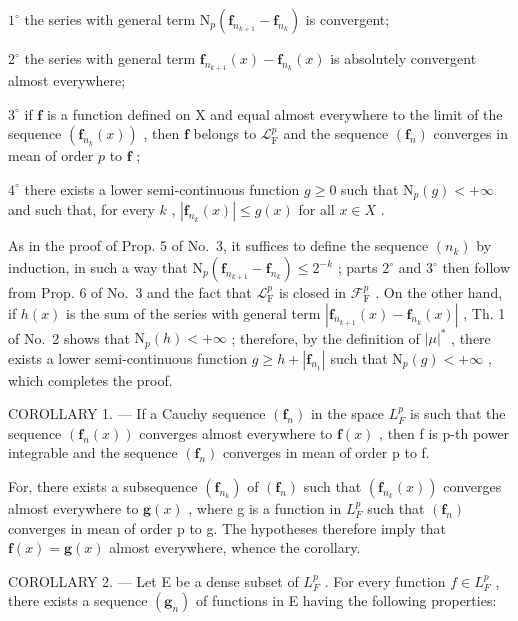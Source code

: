 \(1^{\circ}\) the series with general term \(\mathrm{N}_p(\mathbf{f}_{n_{k + 1}} - \mathbf{f}_{n_k})\) is convergent;

\(2^{\circ}\) the series with general term \(\mathbf{f}_{n_{k+1}}(x) - \mathbf{f}_{n_k}(x)\) is absolutely convergent almost everywhere;

\(3^{\circ}\) if \(\mathbf{f}\) is a function defined on X and equal almost everywhere to the limit of the sequence \((\mathbf{f}_{n_k}(x))\) , then \(\mathbf{f}\) belongs to \(\mathcal{L}_{\mathrm{F}}^p\) and the sequence \((\mathbf{f}_n)\) converges in mean of order \(p\) to \(\mathbf{f}\) ;

\(4^{\circ}\) there exists a lower semi-continuous function \(g \geqslant 0\) such that \(\mathrm{N}_p(g) < +\infty\) and such that, for every \(k\) , \(|\mathbf{f}_{n_k}(x)| \leqslant g(x)\) for all \(x \in X\) .

As in the proof of Prop. 5 of No.~3, it suffices to define the sequence \((n_k)\) by induction, in such a way that \(\mathrm{N}_p(\mathbf{f}_{n_{k+1}} - \mathbf{f}_{n_k}) \leqslant 2^{-k}\) ; parts \(2^\circ\) and \(3^\circ\) then follow from Prop. 6 of No.~3 and the fact that \(\mathcal{L}_{\mathrm{F}}^p\) is closed in \(\mathcal{F}_{\mathrm{F}}^p\) . On the other hand, if \(h(x)\) is the sum of the series with general term \(|\mathbf{f}_{n_{k+1}}(x) - \mathbf{f}_{n_k}(x)|\) , Th. 1 of No.~2 shows that \(\mathrm{N}_p(h) < +\infty\) ; therefore, by the definition of \(|\mu|^*\) , there exists a lower semi-continuous function \(g \geqslant h + |\mathbf{f}_{n_1}|\) such that \(\mathrm{N}_p(g) < +\infty\) , which completes the proof.

COROLLARY 1. --- If a Cauchy sequence \((\mathbf{f}_{n})\) in the space \(L_{F}^{p}\) is such that the sequence \((\mathbf{f}_{n}(x))\) converges almost everywhere to \(\mathbf{f}(x)\) , then f is p-th power integrable and the sequence \((\mathbf{f}_{n})\) converges in mean of order p to f.

For, there exists a subsequence \((\mathbf{f}_{n_{k}})\) of \((\mathbf{f}_{n})\) such that \((\mathbf{f}_{n_{k}}(x))\) converges almost everywhere to \(\mathbf{g}(x)\) , where g is a function in \(L_{F}^{p}\) such that \((\mathbf{f}_{n})\) converges in mean of order p to g. The hypotheses therefore imply that \(\mathbf{f}(x)=\mathbf{g}(x)\) almost everywhere, whence the corollary.

COROLLARY 2. --- Let E be a dense subset of \(L_{F}^{p}\) . For every function \(f \in L_{F}^{p}\) , there exists a sequence \((\mathbf{g}_{n})\) of functions in E having the following properties:

